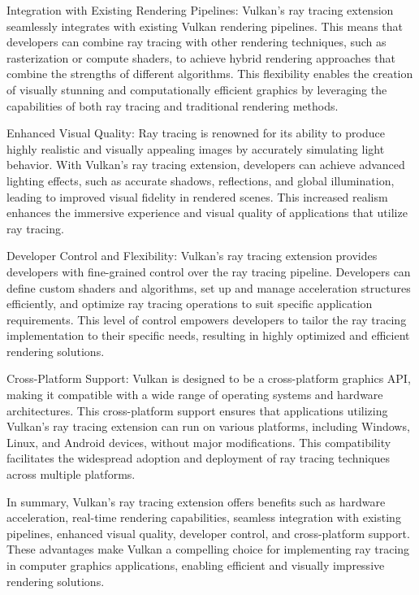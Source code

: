 \documentclass[conference]{IEEEtran}
\begin{document}
Integration with Existing Rendering Pipelines: Vulkan's ray tracing extension seamlessly integrates with existing Vulkan rendering pipelines. This means that developers can combine ray tracing with other rendering techniques, such as rasterization or compute shaders, to achieve hybrid rendering approaches that combine the strengths of different algorithms. This flexibility enables the creation of visually stunning and computationally efficient graphics by leveraging the capabilities of both ray tracing and traditional rendering methods.

Enhanced Visual Quality: Ray tracing is renowned for its ability to produce highly realistic and visually appealing images by accurately simulating light behavior. With Vulkan's ray tracing extension, developers can achieve advanced lighting effects, such as accurate shadows, reflections, and global illumination, leading to improved visual fidelity in rendered scenes. This increased realism enhances the immersive experience and visual quality of applications that utilize ray tracing.

Developer Control and Flexibility: Vulkan's ray tracing extension provides developers with fine-grained control over the ray tracing pipeline. Developers can define custom shaders and algorithms, set up and manage acceleration structures efficiently, and optimize ray tracing operations to suit specific application requirements. This level of control empowers developers to tailor the ray tracing implementation to their specific needs, resulting in highly optimized and efficient rendering solutions.

Cross-Platform Support: Vulkan is designed to be a cross-platform graphics API, making it compatible with a wide range of operating systems and hardware architectures. This cross-platform support ensures that applications utilizing Vulkan's ray tracing extension can run on various platforms, including Windows, Linux, and Android devices, without major modifications. This compatibility facilitates the widespread adoption and deployment of ray tracing techniques across multiple platforms.

In summary, Vulkan's ray tracing extension offers benefits such as hardware acceleration, real-time rendering capabilities, seamless integration with existing pipelines, enhanced visual quality, developer control, and cross-platform support. These advantages make Vulkan a compelling choice for implementing ray tracing in computer graphics applications, enabling efficient and visually impressive rendering solutions.
\end{document}

